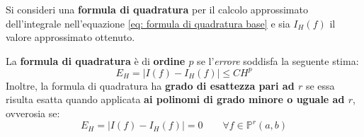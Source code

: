 \highspace
Si consideri una \textbf{formula di quadratura} per il calcolo approssimato dell'integrale nell'equazione \ref{eq: formula di quadratura base} e sia $I_{H}\left(f\right)$ il valore approssimato ottenuto.

La \textbf{formula di quadratura} è di \textbf{ordine $p$} se l'\emph{errore} soddisfa la seguente stima:
\begin{equation}
	E_{H} = \left|I\left(f\right) - I_{H}\left(f\right)\right| \le CH^{p}
\end{equation}
Inoltre, la formula di quadratura ha \textbf{grado di esattezza pari ad $r$} se essa risulta esatta quando applicata \textbf{ai polinomi di grado minore o uguale ad $r$}, ovverosia se:
\begin{equation}
	E_{H} = \left|I\left(f\right) - I_{H}\left(f\right)\right| = 0 \hspace{2em} \forall f \in \mathbb{P}^{r} \left(a,b\right)
\end{equation}
